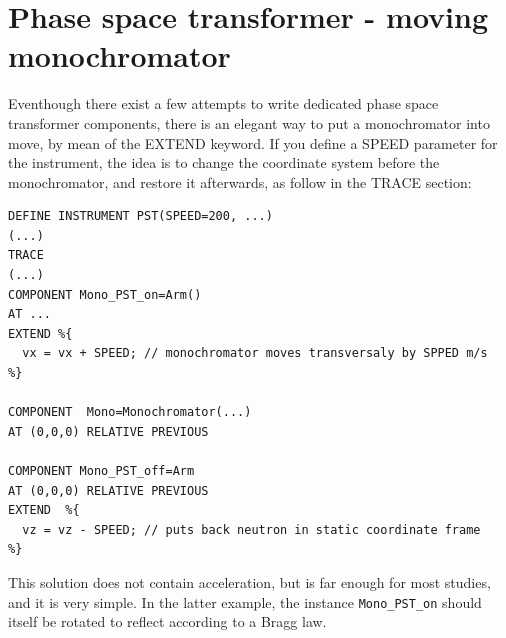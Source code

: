 \section{Phase space transformer - moving monochromator}

Eventhough there exist a few attempts to write dedicated phase space transformer components, there is an elegant way to put a monochromator into move, by mean of the EXTEND keyword. If you define a SPEED parameter for the instrument, the idea is to change the coordinate system before the monochromator, and restore it afterwards, as follow in the TRACE section:
\begin{lstlisting}
DEFINE INSTRUMENT PST(SPEED=200, ...)
(...)
TRACE
(...)
COMPONENT Mono_PST_on=Arm()
AT ...
EXTEND %{
  vx = vx + SPEED; // monochromator moves transversaly by SPPED m/s
%}

COMPONENT  Mono=Monochromator(...)
AT (0,0,0) RELATIVE PREVIOUS

COMPONENT Mono_PST_off=Arm
AT (0,0,0) RELATIVE PREVIOUS
EXTEND  %{
  vz = vz - SPEED; // puts back neutron in static coordinate frame
%}
\end{lstlisting}
This solution does not contain acceleration, but is far enough for most
studies, and it is very simple. In the latter example, the instance \verb+Mono_PST_on+ should itself be rotated to reflect according to a Bragg law.
